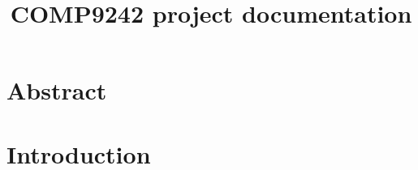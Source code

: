 \documentclass[a4paper, 11pt]{report}
\title{COMP9242 project documentation}
\begin{document}

\chapter{Abstract}
\tableofcontents
\chapter{Introduction}
\end{document}
